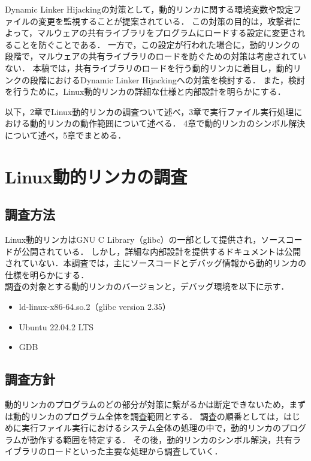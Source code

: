 \documentclass[submit,techreq,noauthor,dvipdfmx]{mid-eco}
\begin{document}
Dynamic Linker Hijackingの対策として，動的リンカに関する環境変数や設定ファイルの変更を監視することが提案されている\cite{MITRE-ATT&CK}．
この対策の目的は，攻撃者によって，マルウェアの共有ライブラリをプログラムにロードする設定に変更されることを防ぐことである．
一方で，この設定が行われた場合に，動的リンクの段階で，マルウェアの共有ライブラリのロードを防ぐための対策は考慮されていない．
本稿では，共有ライブラリのロードを行う動的リンカに着目し，動的リンクの段階におけるDynamic Linker Hijackingへの対策を検討する．
また，検討を行うために，Linux動的リンカの詳細な仕様と内部設計を明らかにする．


以下，2章でLinux動的リンカの調査ついて述べ，3章で実行ファイル実行処理における動的リンカの動作範囲について述べる．
4章で動的リンカのシンボル解決について述べ，5章でまとめる．\\

\section{Linux動的リンカの調査}
\subsection{調査方法}
Linux動的リンカはGNU C Library（glibc）の一部として提供され，ソースコードが公開されている\cite{MITRE-ATT&CK}．
しかし，詳細な内部設計を提供するドキュメントは公開されていない．本調査では，主にソースコードとデバッグ情報から動的リンカの仕様を明らかにする．\\
調査の対象とする動的リンカのバージョンと，デバッグ環境を以下に示す．

  \begin{itemize}
   \item ld-linux-x86-64.so.2（glibc version 2.35）
   \item Ubuntu 22.04.2 LTS
   \item GDB
  \end{itemize}


\subsection{調査方針}
動的リンカのプログラムのどの部分が対策に繋がるかは断定できないため，まずは動的リンカのプログラム全体を調査範囲とする．
調査の順番としては，はじめに実行ファイル実行におけるシステム全体の処理の中で，動的リンカのプログラムが動作する範囲を特定する．
その後，動的リンカのシンボル解決，共有ライブラリのロードといった主要な処理から調査していく．　\\
\end{document}
